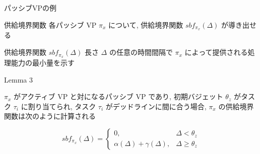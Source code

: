 \begin{frame}{パッシブVPの例}
\end{frame}


\begin{frame}{供給境界関数}
    各パッシブ VP $\pi_{x}$ について, 供給境界関数 $s b f_{\pi_{x}}(\Delta)$ が導き出せる
    \begin{block}{供給境界関数 $s b f_{\pi_{x}}(\Delta)$}
        長さ $\Delta$ の任意の時間間隔で $\pi_{x}$ によって提供される処理能力の最小量を示す
    \end{block}
\end{frame}

\begin{frame}[label=lemma3]{Lemma 3}
    \begin{lemma}[]
        $\pi_{x}$ がアクティブ VP と対になるパッシブ VP であり, 初期バジェット $\theta_{z}$ がタスク $\tau_{i}$ に割り当てられ, タスク $\tau_{i}$ がデッドラインに間に合う場合, $\pi_{x}$ の供給境界関数は次のように計算される

        \begin{equation*}
            s b f_{\pi_{x}}(\Delta)= \begin{cases}0, & \Delta<\theta_{z} \\ \alpha(\Delta)+\gamma(\Delta), & \Delta \geq \theta_{z}\end{cases}
        \end{equation*}
    \end{lemma}
\end{frame}

